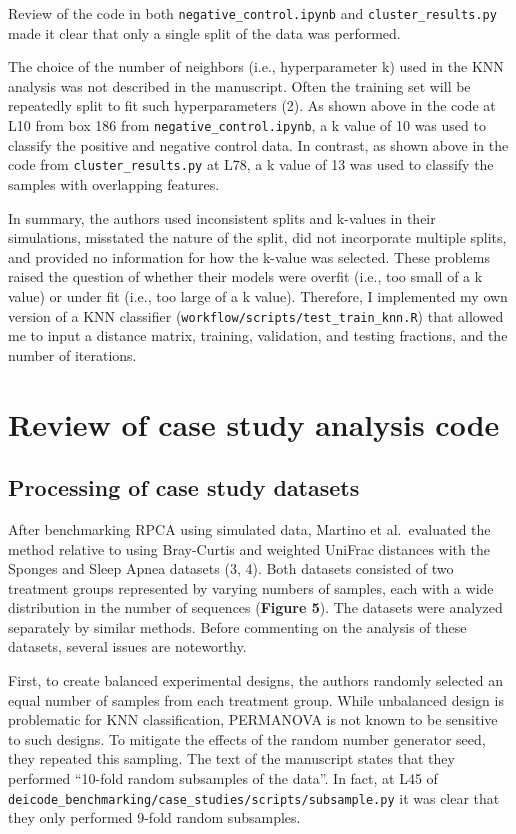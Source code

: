 \documentclass[
]{article}
\begin{document}
\normalsize{}

Review of the code in both \texttt{negative\_control.ipynb} and
\texttt{cluster\_results.py} made it clear that only a single split of
the data was performed.

The choice of the number of neighbors (i.e., hyperparameter k) used in
the KNN analysis was not described in the manuscript. Often the training
set will be repeatedly split to fit such hyperparameters (2). As shown
above in the code at L10 from box 186 from
\texttt{negative\_control.ipynb}, a k value of 10 was used to classify
the positive and negative control data. In contrast, as shown above in
the code from \texttt{cluster\_results.py} at L78, a k value of 13 was
used to classify the samples with overlapping features.

In summary, the authors used inconsistent splits and k-values in their
simulations, misstated the nature of the split, did not incorporate
multiple splits, and provided no information for how the k-value was
selected. These problems raised the question of whether their models
were overfit (i.e., too small of a k value) or under fit (i.e., too
large of a k value). Therefore, I implemented my own version of a KNN
classifier (\texttt{workflow/scripts/test\_train\_knn.R}) that allowed
me to input a distance matrix, training, validation, and testing
fractions, and the number of iterations.

\section{Review of case study analysis
code}\label{review-of-case-study-analysis-code}

\subsection{Processing of case study
datasets}\label{processing-of-case-study-datasets}

After benchmarking RPCA using simulated data, Martino et al.~evaluated
the method relative to using Bray-Curtis and weighted UniFrac distances
with the Sponges and Sleep Apnea datasets (3, 4). Both datasets
consisted of two treatment groups represented by varying numbers of
samples, each with a wide distribution in the number of sequences
(\textbf{Figure 5}). The datasets were analyzed separately by similar
methods. Before commenting on the analysis of these datasets, several
issues are noteworthy.

First, to create balanced experimental designs, the authors randomly
selected an equal number of samples from each treatment group. While
unbalanced design is problematic for KNN classification, PERMANOVA is
not known to be sensitive to such designs. To mitigate the effects of
the random number generator seed, they repeated this sampling. The text
of the manuscript states that they performed ``10-fold random subsamples
of the data''. In fact, at L45 of
\texttt{deicode\_benchmarking/case\_studies/scripts/subsample.py} it was
clear that they only performed 9-fold random subsamples.
\end{document}
